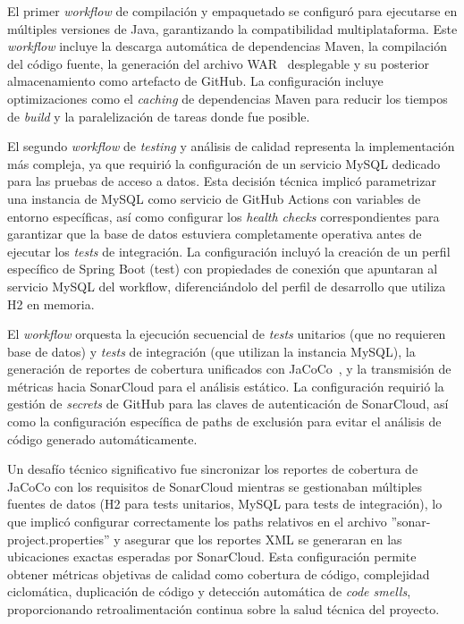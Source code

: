 El primer \emph{workflow} de compilación y empaquetado se configuró para ejecutarse en múltiples versiones de Java, garantizando la compatibilidad multiplataforma. Este \emph{workflow} incluye la descarga automática de dependencias Maven, la compilación del código fuente, la generación del archivo WAR~\cite{war} desplegable y su posterior almacenamiento como artefacto de GitHub. La configuración incluye optimizaciones como el \emph{caching} de dependencias Maven para reducir los tiempos de \emph{build} y la paralelización de tareas donde fue posible.

El segundo \emph{workflow} de \emph{testing} y análisis de calidad representa la implementación más compleja, ya que requirió la configuración de un servicio MySQL dedicado para las pruebas de acceso a datos. Esta decisión técnica implicó parametrizar una instancia de MySQL como servicio de GitHub Actions con variables de entorno específicas, así como configurar los \emph{health checks} correspondientes para garantizar que la base de datos estuviera completamente operativa antes de ejecutar los \emph{tests} de integración. La configuración incluyó la creación de un perfil específico de Spring Boot (test) con propiedades de conexión que apuntaran al servicio MySQL del workflow, diferenciándolo del perfil de desarrollo que utiliza H2 en memoria.

El \emph{workflow} orquesta la ejecución secuencial de \emph{tests} unitarios (que no requieren base de datos) y \emph{tests} de integración (que utilizan la instancia MySQL), la generación de reportes de cobertura unificados con JaCoCo~\cite{jacoco}, y la transmisión de métricas hacia SonarCloud para el análisis estático. La configuración requirió la gestión de \emph{secrets} de GitHub para las claves de autenticación de SonarCloud, así como la configuración específica de paths de exclusión para evitar el análisis de código generado automáticamente.

Un desafío técnico significativo fue sincronizar los reportes de cobertura de JaCoCo con los requisitos de SonarCloud mientras se gestionaban múltiples fuentes de datos (H2 para tests unitarios, MySQL para tests de integración), lo que implicó configurar correctamente los paths relativos en el archivo ''sonar-project.properties'' y asegurar que los reportes XML se generaran en las ubicaciones exactas esperadas por SonarCloud. Esta configuración permite obtener métricas objetivas de calidad como cobertura de código, complejidad ciclomática, duplicación de código y detección automática de \emph{code smells}, proporcionando retroalimentación continua sobre la salud técnica del proyecto.
